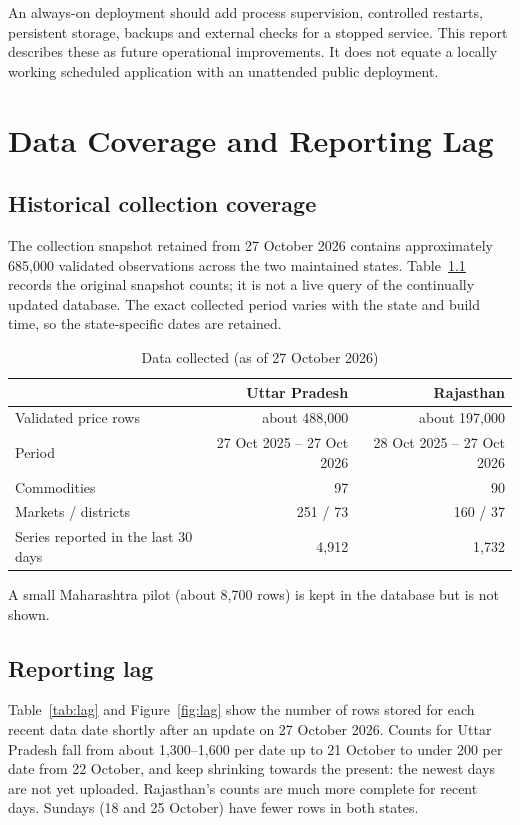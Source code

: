 \documentclass[12pt,a4paper,oneside]{report}
\numberwithin{equation}{chapter}
\numberwithin{figure}{chapter}
\numberwithin{table}{chapter}
\theoremstyle{definition}
\begin{document}
An always-on deployment should add process supervision, controlled restarts, persistent storage, backups and external checks for a stopped service. This report describes these as future operational improvements. It does not equate a locally working scheduled application with an unattended public deployment.

\chapter{Data Coverage and Reporting Lag}

\section{Historical collection coverage}
The collection snapshot retained from 27 October 2026 contains approximately 685,000 validated observations across the two maintained states. Table~\ref{tab:data} records the original snapshot counts; it is not a live query of the continually updated database. The exact collected period varies with the state and build time, so the state-specific dates are retained.

\begin{table}[H]
\centering
\caption{Data collected (as of 27 October 2026)}
\label{tab:data}
\small
\begin{tabular}{@{}lrr@{}}
\toprule
& Uttar Pradesh & Rajasthan \\
\midrule
Validated price rows & about 488{,}000 & about 197{,}000 \\
Period & 27 Oct 2025 -- 27 Oct 2026 & 28 Oct 2025 -- 27 Oct 2026 \\
Commodities & 97 & 90 \\
Markets / districts & 251 / 73 & 160 / 37 \\
Series reported in the last 30 days & 4{,}912 & 1{,}732 \\
\bottomrule
\end{tabular}
\end{table}
A small Maharashtra pilot (about 8{,}700 rows) is kept in the database but is not shown.

\section{Reporting lag}
Table~\ref{tab:lag} and Figure~\ref{fig:lag} show the number of rows stored for each recent data date shortly after an update on 27 October 2026. Counts for Uttar Pradesh fall from about 1,300--1,600 per date up to 21 October to under 200 per date from 22 October, and keep shrinking towards the present: the newest days are not yet uploaded. Rajasthan's counts are much more complete for recent days. Sundays (18 and 25 October) have fewer rows in both states.
\end{document}
